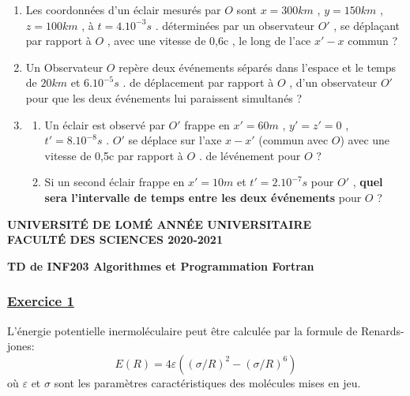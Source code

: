 \documentclass[a4paper, 11pt]{report}
\begin{document}
\begin{enumerate}
  \item[A1] Les coordonnées d'un éclair mesurés par $O$ sont $ x = 300 km $ , $ y = 150 km $ , $ z = 100 km $ , à $ t = 4.10^{-3}s $ .  déterminées par un observateur $O'$ , se déplaçant par rapport à $O$ , avec une vitesse de 0,6c , le long de l'ace $x' - x$ commun ?
  \item[A2] Un Observateur $O$  repère deux événements séparés dans l'espace et le temps de $ 20 km $ et $ 6.10^{-5} s $ .  de déplacement par rapport à $O$ , d'un  observateur $O'$ pour que les deux événements lui paraissent simultanés ?
  \item[A3] 
  \begin{enumerate}
    \item[(a)] Un éclair est observé par $O'$ frappe en $ x' = 60 m $ , $ y' = z' = 0$ , $ t' = 8.10^{-8} s $ . $O'$ se déplace sur l'axe $ x - x' $ (commun avec $O$) avec une vitesse de 0,5c par rapport à $O$ .  de lévénement pour $O$ ?
    \item[(b)] Si un second éclair frappe en $ x' = 10 m $ et $ t' = 2.10^{-7} s $ pour $O'$ , {\bf quel sera l'intervalle de temps entre les deux événements} pour $O$ ?
  \end{enumerate} 
\end{enumerate}

\newpage

\noindent
{\bf UNIVERSITÉ DE LOMÉ \hfill ANNÉE UNIVERSITAIRE \\
FACULTÉ DES SCIENCES \hfill 2020-2021 }

\begin{center}
  {\bf TD de INF203 Algorithmes et Programmation Fortran}
\end{center}

\subsubsection{\underline{Exercice 1}}

\noindent
L'énergie potentielle inermoléculaire peut être calculée par la formule de Renards-jones: 
$$ E(R) = 4\varepsilon((\sigma/R)^2 - (\sigma/R)^6) $$
où $\varepsilon$ et $\sigma$ sont les paramètres caractéristiques des molécules mises en jeu. \\

\vspace{0,5 cm}
\end{document}
